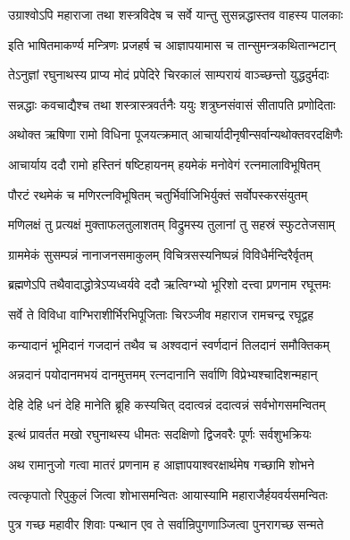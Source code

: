 \twolineshloka
{उग्राश्वोऽपि महाराजा तथा शस्त्रविदेष च}
{सर्वे यान्तु सुसन्नद्धास्तव वाहस्य पालकाः}%

\twolineshloka
{इति भाषितमाकर्ण्य मन्त्रिणः प्रजहर्ष च}
{आज्ञापयामास च तान्सुमन्त्रकथितान्भटान्}%

\twolineshloka
{तेऽनुज्ञां रघुनाथस्य प्राप्य मोदं प्रपेदिरे}
{चिरकालं साम्परायं वाञ्च्छन्तो युद्धदुर्मदाः}%

\twolineshloka
{सन्नद्धाः कवचाद्यैश्च तथा शस्त्रास्त्रवर्तनैः}
{ययुः शत्रुघ्नसंवासं सीतापति प्रणोदिताः}%


\twolineshloka
{अथोक्त ऋषिणा रामो विधिना पूजयत्क्रमात्}
{आचार्यादीनृषीन्सर्वान्यथोक्तवरदक्षिणैः}%

\twolineshloka
{आचार्याय ददौ रामो हस्तिनं षष्टिहायनम्}
{हयमेकं मनोवेगं रत्नमालाविभूषितम्}%

\twolineshloka
{पौरटं रथमेकं च मणिरत्नविभूषितम्}
{चतुर्भिर्वाजिभिर्युक्तं सर्वोपस्करसंयुतम्}%

\twolineshloka
{मणिलक्षं तु प्रत्यक्षं मुक्ताफलतुलाशतम्}
{विद्रुमस्य तुलानां तु सहस्रं स्फुटतेजसाम्}%

\twolineshloka
{ग्राममेकं सुसम्पन्नं नानाजनसमाकुलम्}
{विचित्रसस्यनिष्पन्नं विविधैर्मन्दिरैर्वृतम्}%

\twolineshloka
{ब्रह्मणेऽपि तथैवादाद्धोत्रेऽप्यध्वर्यवे ददौ}
{ऋत्विग्भ्यो भूरिशो दत्त्वा प्रणनाम रघूत्तमः}%

\twolineshloka
{सर्वे ते विविधा वाग्भिराशीर्भिरभिपूजिताः}
{चिरञ्जीव महाराज रामचन्द्र रघूद्वह}%

\twolineshloka
{कन्यादानं भूमिदानं गजदानं तथैव च}
{अश्वदानं स्वर्णदानं तिलदानं समौक्तिकम्}%

\twolineshloka
{अन्नदानं पयोदानमभयं दानमुत्तमम्}
{रत्नदानानि सर्वाणि विप्रेभ्यश्चादिशन्महान्}%

\twolineshloka
{देहि देहि धनं देहि मानेति ब्रूहि कस्यचित्}
{ददात्वन्नं ददात्वन्नं सर्वभोगसमन्वितम्}%

\twolineshloka
{इत्थं प्रावर्तत मखो रघुनाथस्य धीमतः}
{सदक्षिणो द्विजवरैः पूर्णः सर्वशुभक्रियः}%

\twolineshloka
{अथ रामानुजो गत्वा मातरं प्रणनाम ह}
{आज्ञापयाश्वरक्षार्थमेष गच्छामि शोभने}%

\twolineshloka
{त्वत्कृपातो रिपुकुलं जित्वा शोभासमन्वितः}
{आयास्यामि महाराजैर्हयवर्यसमन्वितः}%


\twolineshloka
{पुत्र गच्छ महावीर शिवाः पन्थान एव ते}
{सर्वान्रिपुगणाञ्जित्वा पुनरागच्छ सन्मते}%

